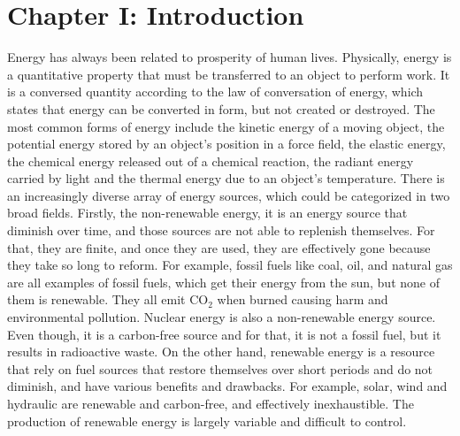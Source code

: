 \documentclass[reprint,amsmath,amssymb,aps,floatfix,
]{revtex4-2}
\begin{document}
\section*{\label{sec:level1}C\lowercase{hapter} I: I\lowercase{ntroduction}}
Energy has always been related to prosperity of human lives. Physically, energy is a quantitative property that must be transferred to an object to perform work. It is a conversed quantity according to the law of conversation of energy, which states that energy can be converted in form, but not created or destroyed. The most common forms of energy include the kinetic energy of a moving object, the potential energy stored by an object's position in a force field, the elastic energy, the chemical energy released out of a chemical reaction, the radiant energy carried by light and the thermal energy due to an object's temperature. There is an increasingly diverse array of energy sources, which could be categorized in two broad fields. Firstly, the non-renewable energy, it is an energy source that diminish over time, and those sources are not able to replenish themselves. For that, they are finite, and once they are used, they are effectively gone because they take so long to reform. For example, fossil fuels like coal, oil, and natural gas are all examples of  fossil fuels, which get their energy from the sun, but none of them is renewable. They all emit CO$_2$ when burned causing harm and environmental pollution. Nuclear energy is also a non-renewable energy source. Even though, it is a carbon-free source and for that, it is not a fossil fuel, but it  results in radioactive waste. On the other hand, renewable energy is a resource that rely on fuel sources that restore themselves over short periods and do not diminish, and have various benefits and drawbacks. For example, solar, wind and hydraulic are renewable and carbon-free, and effectively inexhaustible. The production of renewable energy is largely variable and difficult to control.
\end{document}
